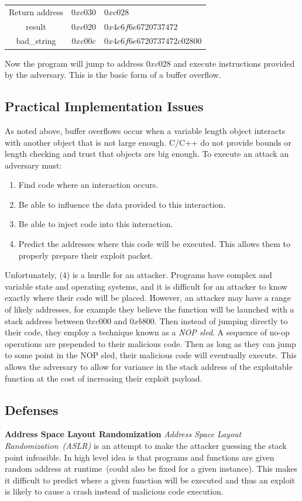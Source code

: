 \documentclass{article}
\begin{document}
\begin{tabular}{c|c|l}
Return address & $0xc030$ & $0xc028$\\
result & $0xc020$ & $0x4c6f6e6720737472$\\
bad\_string & $0xc00c$ & $0x4c6f6e6720737472c02800$\\
\end{tabular}

Now the program will jump to address $0xc028$ and execute instructions provided by the adversary.  This is the basic form of a buffer overflow.

\subsection{Practical Implementation Issues}
As noted above, buffer overflows occur when a variable length object interacts with another object that is not large enough.  C/C++ do not provide bounds or length checking and trust that objects are big enough.  To execute an attack an adversary must:

\begin{enumerate}
\item Find code where an interaction occurs.
\item Be able to influence the data provided to this interaction.
\item Be able to inject code into this interaction.
\item Predict the addresses where this code will be executed.  This allows them to properly prepare their exploit packet.
\end{enumerate}

Unfortunately, (4) is a hurdle for an attacker.  Programs have complex and variable state and operating systems, and it is difficult for an attacker to know exactly where their code will be placed.  However, an attacker may have a range of likely addresses, for example they believe the function will be launched with a stack address between $0xc000$ and $0xb800$.  Then instead of jumping directly to their code, they employ a technique known as a \emph{NOP sled}.  A sequence of no-op operations are prepended to their malicious code.  Then as long as they can jump to some point in the NOP sled, their malicious code will eventually execute.  This allows the adversary to allow for variance in the stack address of the exploitable function at the cost of increasing their exploit payload.

\subsection{Defenses}
\textbf{Address Space Layout Randomization}
\emph{Address Space Layout Randomization~(ASLR)} is an attempt to make the attacker guessing the stack point infeasible.  In high level idea is that programs and functions are given random address at runtime~(could also be fixed for a given instance).  This makes it difficult to predict where a given function will be executed and thus an exploit is likely to cause a crash instead of malicious code execution.
\end{document}
